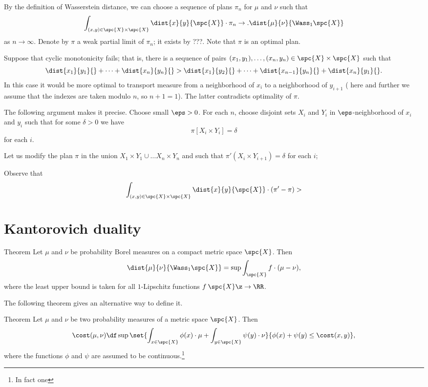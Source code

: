 By the definition of Wasserstein distance, we can choose a sequence of plans $\pi_n$ for $\mu$ and $\nu$ such that 
\[\int_{(x,y)\in\spc{X}\times\spc{X}}\dist{x}{y}{\spc{X}}\cdot\pi_n\to .\dist{\mu}{\nu}{\Wass_1\spc{X}}\]
as $n\to \infty$.
Denote by $\pi$ a weak partial limit of $\pi_n$;
it exists by ???.
Note that $\pi$ is an optimal plan.

Suppose that cyclic monotonicity fails;
that is, there is a sequence of pairs $(x_1,y_1),\dots,(x_n,y_n)\in\spc{X}\times\spc{X}$ such that
\[\dist{x_1}{y_1}{}+\dots+\dist{x_n}{y_n}{}
>
\dist{x_1}{y_2}{}+\dots+\dist{x_{n-1}}{y_n}{}+\dist{x_{n}}{y_1}{}.\]
In this case it would be more optimal to transport measure from a neighborhood of $x_i$ to a neighborhood of $y_{i+1}$ (
here and further we assume that the indexes are taken modulo $n$, so $n+1=1$).
The latter contradicts optimality of $\pi$.

The following argument makes it precise.
Choose small $\eps>0$.
For each $n$,
choose disjoint sets $X_i$ and $Y_i$ in $\eps$-neighborhood of $x_i$ and $y_i$
such that for some $\delta>0$ we have 
\[\pi [X_i\times Y_i]=\delta\]
for each $i$.

Let us modify the plan $\pi$ in the union $X_1\times Y_1\cup \dots X_n\times Y_n$ and such that 
$\pi'(X_i\times Y_{i+1})=\delta$ for each $i$;


Observe that
\[\int_{(x,y)\in\spc{X}\times\spc{X}}\dist{x}{y}{\spc{X}}\cdot(\pi'-\pi)>\]
\qeds


\section{Kantorovich duality}


\begin{thm}{Theorem}
Let $\mu$ and $\nu$ be probability Borel measures on a compact metric space $\spc{X}$.
Then
\[\dist{\mu}{\nu}{\Wass_1\spc{X}}=\sup\int_{\spc{X}} f\cdot(\mu-\nu),\]
where the least upper bound is taken for all $1$-Lipschitz functions $f\:\spc{X}\z\to\RR$.
\end{thm}


The following theorem gives an alternative way to define it.

\begin{thm}{Theorem}
Let $\mu$ and $\nu$ be two probability measures of a metric space $\spc{X}$.
Then 
\[\cost(\mu,\nu)
\df
\sup\set{\int_{x\in\spc{X}}\phi(x)\cdot\mu+\int_{y\in\spc{X}}\psi(y)\cdot\nu}{\phi(x)+\psi(y)\le \cost(x,y)},\]
where the functions $\phi$ and $\psi$ are assumed to be continuous.\footnote{In fact one }
\end{thm}





